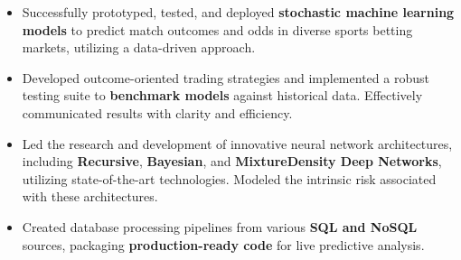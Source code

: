 \documentclass[11 pt,oneside,a4paper,titlepage]{article}
\newcommand{\json}[1]{\directlua{tex.print(table#1)}}
\begin{document}
                  \footnotesize{
                    \begin{itemize}
                    \item Successfully prototyped, tested, and deployed \textbf{stochastic machine learning models} to predict match outcomes and odds in diverse sports betting markets, utilizing a data-driven approach.
                    \item Developed outcome-oriented trading strategies and implemented a robust testing suite to \textbf{benchmark models} against historical data. Effectively communicated results with clarity and efficiency.
                    \item Led the research and development of innovative neural network architectures, including \textbf{Recursive}, \textbf{Bayesian}, and \textbf{MixtureDensity Deep Networks}, utilizing state-of-the-art technologies. Modeled the intrinsic risk associated with these architectures.
                    \item Created database processing pipelines from various \textbf{SQL and NoSQL} sources, packaging \textbf{production-ready code} for live predictive analysis.
                    \end{itemize}
                  }
        \vspace*{0.22cm}                        
\end{document}
